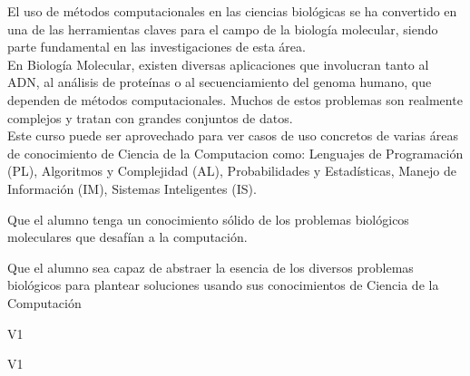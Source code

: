 \begin{syllabus}


\begin{justification}
El uso de métodos computacionales en las ciencias biológicas se ha convertido en una de las herramientas claves para el campo de la biología molecular, siendo parte fundamental en las investigaciones de esta área. 
\\
En Biología Molecular, existen diversas aplicaciones que involucran tanto al ADN, al análisis de proteínas o al secuenciamiento del genoma humano, que dependen de métodos computacionales. Muchos de estos problemas son realmente complejos y tratan con grandes conjuntos de datos. 
\\
Este curso puede ser aprovechado para ver casos de uso concretos de varias áreas de conocimiento de Ciencia de la Computacion como: Lenguajes de Programación (PL), Algoritmos y Complejidad (AL), Probabilidades y Estadísticas, Manejo de Información (IM), Sistemas Inteligentes (IS).
\end{justification}

\begin{goals}
\item Que el alumno tenga un conocimiento sólido de los problemas biológicos moleculares que desafían a la computación.
\item Que el alumno sea capaz de abstraer la esencia de los diversos problemas biológicos para plantear soluciones usando sus conocimientos de Ciencia de la Computación
\end{goals}

\begin{outcomes}{V1}
    \item {}
    \item {}
    \item {}
\end{outcomes}

\begin{competences}{V1}
    \item {} 
    \item {}
    \item {}
\end{competences}


\end{syllabus}
